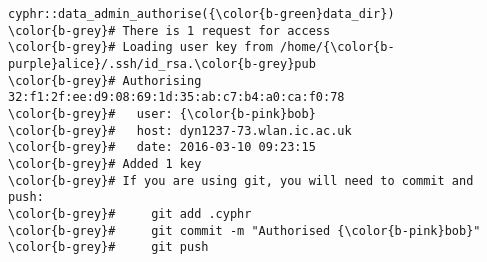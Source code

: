 \documentclass[class=minimal,border=0]{standalone}
\begin{document}
%
\begin{BVerbatim}[bgcolor=b-darkgrey]
cyphr::data_admin_authorise({\color{b-green}data_dir})
\color{b-grey}# There is 1 request for access
\color{b-grey}# Loading user key from /home/{\color{b-purple}alice}/.ssh/id_rsa.\color{b-grey}pub
\color{b-grey}# Authorising 32:f1:2f:ee:d9:08:69:1d:35:ab:c7:b4:a0:ca:f0:78
\color{b-grey}#   user: {\color{b-pink}bob}
\color{b-grey}#   host: dyn1237-73.wlan.ic.ac.uk
\color{b-grey}#   date: 2016-03-10 09:23:15
\color{b-grey}# Added 1 key
\color{b-grey}# If you are using git, you will need to commit and push:
\color{b-grey}#     git add .cyphr
\color{b-grey}#     git commit -m "Authorised {\color{b-pink}bob}"
\color{b-grey}#     git push
\end{BVerbatim}
\end{document}
